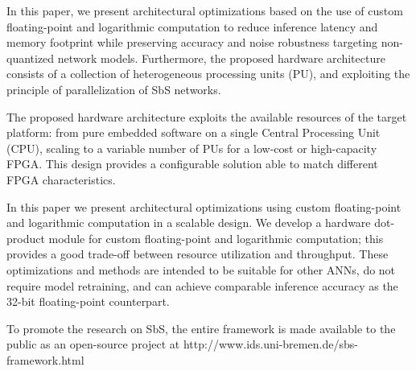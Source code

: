 In this paper, we present architectural optimizations based on the use of custom floating-point and logarithmic computation to reduce inference latency and memory footprint while preserving accuracy and noise robustness targeting non-quantized network models. Furthermore, the proposed hardware architecture consists of a collection of heterogeneous processing units (PU), and exploiting the principle of parallelization of SbS networks.

The proposed hardware architecture exploits the available resources of the target platform: from pure embedded software on a single Central Processing Unit (CPU), scaling to a variable number of PUs for a low-cost or high-capacity FPGA. This design provides a configurable solution able to match different FPGA characteristics.

In this paper we present architectural optimizations using custom floating-point and logarithmic computation in a scalable design. We develop a hardware dot-product module for custom floating-point and logarithmic computation; this provides a good trade-off between resource utilization and throughput. These optimizations and methods are intended to be suitable for other ANNs, do not require model retraining, and can achieve comparable inference accuracy as the 32-bit floating-point counterpart.


To promote the research on SbS, the entire framework is made available to the public as an open-source project at http://www.ids.uni-bremen.de/sbs-framework.html

